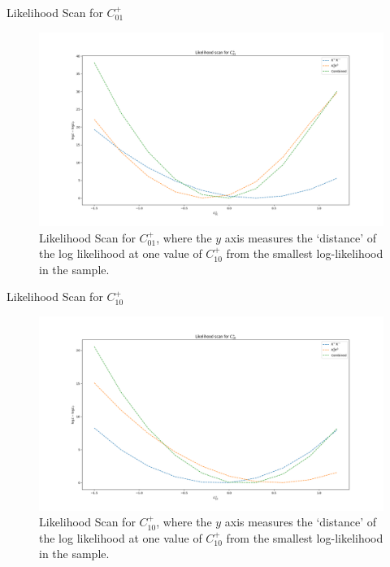 \begin{frame}{Likelihood Scan for $C_{01}^{+}$}
\begin{figure}
    \centering
        \includegraphics[width=\textwidth]{2020_04_23/figs/P01_Norm.png}
    \caption{Likelihood Scan for $C_{01}^{+}$, where the $y$ axis measures the `distance' of the log likelihood at one value of $C_{10}^{+}$ from the smallest log-likelihood in the sample.}
    \label{fig:scanCP01}
\end{figure}
\end{frame}

\begin{frame}{Likelihood Scan for $C_{10}^{+}$}
\begin{figure}
    \centering
        \includegraphics[width=\textwidth]{2020_04_23/figs/P10_Norm.png}
    \caption{Likelihood Scan for $C_{10}^{+}$, where the $y$ axis measures the `distance' of the log likelihood at one value of $C_{10}^{+}$ from the smallest log-likelihood in the sample.}
    \label{fig:scanCP10}
\end{figure}
\end{frame}

